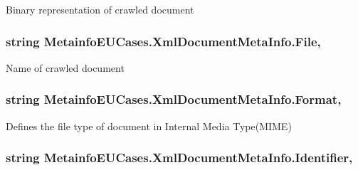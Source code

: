 Binary representation of crawled document 

\hypertarget{class_metainfo_e_u_cases_1_1_xml_document_meta_info_aa34330040fdd529c5fb3ed459525e0fa}{
\subsubsection[{File}]{\setlength{\rightskip}{0pt plus 5cm}string Metainfo\-E\-U\-Cases.\-Xml\-Document\-Meta\-Info.\-File\hspace{0.3cm}{\ttfamily [get]}, {\ttfamily [set]}}}\label{class_metainfo_e_u_cases_1_1_xml_document_meta_info_aa34330040fdd529c5fb3ed459525e0fa}


Name of crawled document 

\hypertarget{class_metainfo_e_u_cases_1_1_xml_document_meta_info_afd0619ebe1e7c2592d72ab10982e551e}{
\subsubsection[{Format}]{\setlength{\rightskip}{0pt plus 5cm}string Metainfo\-E\-U\-Cases.\-Xml\-Document\-Meta\-Info.\-Format\hspace{0.3cm}{\ttfamily [get]}, {\ttfamily [set]}}}\label{class_metainfo_e_u_cases_1_1_xml_document_meta_info_afd0619ebe1e7c2592d72ab10982e551e}


Defines the file type of document in Internal Media Type(\-M\-I\-M\-E) 

\hypertarget{class_metainfo_e_u_cases_1_1_xml_document_meta_info_ae3037fb0c032e1aafee527da90cf4343}{
\subsubsection[{Identifier}]{\setlength{\rightskip}{0pt plus 5cm}string Metainfo\-E\-U\-Cases.\-Xml\-Document\-Meta\-Info.\-Identifier\hspace{0.3cm}{\ttfamily [get]}, {\ttfamily [set]}}}\label{class_metainfo_e_u_cases_1_1_xml_document_meta_info_ae3037fb0c032e1aafee527da90cf4343}


